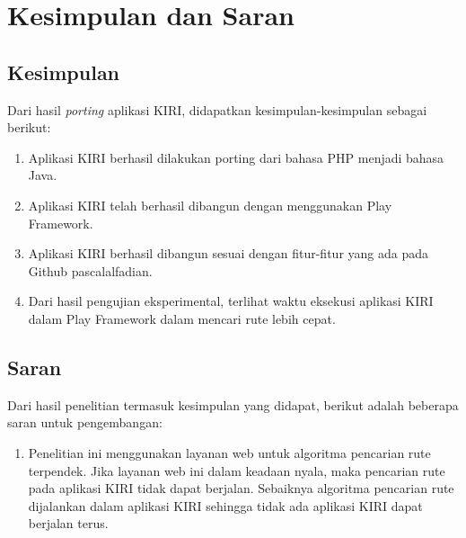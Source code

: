 \chapter{Kesimpulan dan Saran}
\label{chap:kesimpulan_saran}

\section{Kesimpulan}
\label{sec:kesimpulan}

Dari hasil \textit{porting} aplikasi KIRI, didapatkan kesimpulan-kesimpulan sebagai berikut:
	\begin{enumerate}
		\item Aplikasi KIRI berhasil dilakukan porting dari bahasa PHP menjadi bahasa Java.
		\item Aplikasi KIRI telah berhasil dibangun dengan menggunakan Play Framework.
		\item Aplikasi KIRI berhasil dibangun sesuai dengan fitur-fitur yang ada pada Github pascalalfadian\cite{githubkiri}.
		\item Dari hasil pengujian eksperimental, terlihat waktu eksekusi aplikasi KIRI dalam Play Framework dalam mencari rute lebih cepat.
	\end{enumerate}

\section{Saran}
\label{sec:saran}
Dari hasil penelitian termasuk kesimpulan yang didapat, berikut adalah beberapa saran untuk pengembangan:
\begin{enumerate}
	\item Penelitian ini menggunakan layanan web untuk algoritma pencarian rute terpendek. Jika layanan web ini dalam keadaan nyala, maka pencarian rute pada aplikasi KIRI tidak dapat berjalan. Sebaiknya algoritma pencarian rute dijalankan dalam aplikasi KIRI sehingga tidak ada aplikasi KIRI dapat berjalan terus.
\end{enumerate}